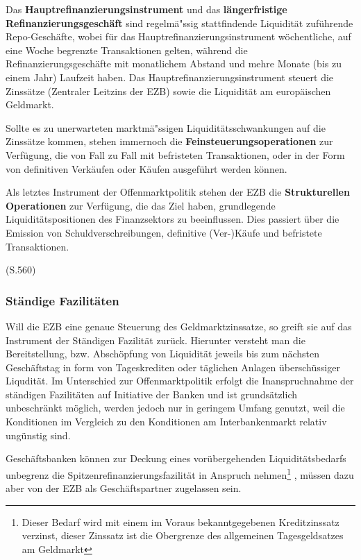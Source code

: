 \documentclass[
  onecolumn,
  a4paper,
  abstracton,
  parskip=half
  ,final
  ]{scrartcl}
\begin{document}
Das \textbf{Hauptrefinanzierungsinstrument} und das \textbf{l{\"a}ngerfristige Refinanzierungsgesch{\"a}ft} sind regelm{\"a}{"ss}ig stattfindende Liquidit{\"a}t zuf{\"u}hrende Repo-Gesch{\"a}fte, wobei f{\"u}r das Hauptrefinanzierungsinstrument w{\"o}chentliche, auf eine Woche begrenzte Transaktionen gelten, w{\"a}hrend die Refinanzierungsgesch{\"a}fte mit monatlichem Abstand und mehre Monate (bis zu einem Jahr) Laufzeit haben. Das Hauptrefinanzierungsinstrument steuert die Zinss{\"a}tze (Zentraler Leitzins der EZB) sowie die Liquidit{\"a}t am europ{\"a}ischen Geldmarkt.

Sollte es zu unerwarteten marktm{\"a}{"ss}igen Liquidit{\"a}tsschwankungen auf die Zinss{\"a}tze kommen, stehen immernoch die \textbf{Feinsteuerungsoperationen} zur Verf{\"u}gung, die von Fall zu Fall mit befristeten Transaktionen, oder in der Form von definitiven Verk{\"a}ufen oder K{\"a}ufen ausgef{\"u}hrt werden k{\"o}nnen.


Als letztes Instrument der Offenmarktpolitik stehen der EZB die \textbf{Strukturellen Operationen} zur Verf{\"u}gung, die das Ziel haben, grundlegende Liquidit{\"a}tspositionen des Finanzsektors zu beeinflussen. Dies passiert {\"u}ber die Emission von Schuldverschreibungen, definitive (Ver-)K{\"a}ufe und befristete Transaktionen.

(S.560)

\citep[vgl.][S.560ff]{Basseler2010}
\subsubsection{St{\"a}ndige Fazilit{\"a}ten}

Will die EZB eine genaue Steuerung des Geldmarktzinssatze, so greift sie auf das Instrument der St{\"a}ndigen Fazilit{\"a}t zur{\"u}ck. Hierunter versteht man die Bereitstellung, bzw. Absch{\"o}pfung von Liquidit{\"a}t jeweils bis zum n{\"a}chsten Gesch{\"a}ftstag in form von Tageskrediten oder t{\"a}glichen Anlagen {\"u}bersch{\"u}ssiger Liqudit{\"a}t. Im Unterschied zur Offenmarktpolitik erfolgt die Inanspruchnahme der st{\"a}ndigen Fazilit{\"a}ten auf Initiative der Banken und ist grunds{\"a}tzlich unbeschr{\"a}nkt m{\"o}glich, werden jedoch nur in geringem Umfang genutzt, weil die Konditionen im Vergleich zu den Konditionen am Interbankenmarkt relativ ung{\"u}nstig sind.

Gesch{\"a}ftsbanken k{\"o}nnen zur Deckung eines vor{\"u}bergehenden Liquidit{\"a}tsbedarfs unbegrenz die Spitzenrefinanzierungsfazilit{\"a}t in Anspruch nehmen\footnote[36]{Dieser Bedarf wird mit einem im Voraus bekanntgegebenen Kreditzinssatz verzinst, dieser Zinssatz ist die Obergrenze des allgemeinen Tagesgeldsatzes am Geldmarkt}
, m{\"u}ssen dazu aber von der EZB als Gesch{\"a}ftspartner zugelassen sein.
\end{document}
